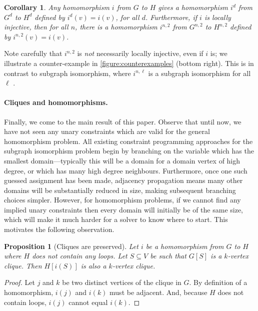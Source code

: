 \documentclass{article}
\newtheorem{proposition}{Proposition}
\newtheorem{corollary}{Corollary}
\begin{document}
\begin{corollary}Any homomorphism $i$ from $G$ to $H$ gives a homomorphism $i^d$ from $G^d$ to $H^d$
    defined by $i^d(v) = i(v)$, for all $d$. Furthermore, if $i$ is locally injective, then for all
    $n$, there is a homomorphism $i^{n,2}$ from $G^{n,2}$ to
    $H^{n,2}$ defined by $i^{n,2}(v) = i(v)$.\label{corollary:lishapes}
\end{corollary}

Note carefully that $i^{n,2}$ is \emph{not} necessarily locally injective, even if $i$ is; we
illustrate a counter-example in \cref{figure:counterexamples} (bottom right). This is in contrast to
subgraph isomorphism, where $i^{n,\ell}$ is a subgraph isomorphism for all $\ell$
\cite{DBLP:conf/cp/McCreeshP15}.

\paragraph{Cliques and homomorphisms.} Finally, we come to the main result of this paper. Observe
that until now, we have not seen any unary constraints which are valid for the general homomorphism
problem. All existing constraint programming approaches for the subgraph isomorphism problem begin
by branching on the variable which has the smallest domain---typically this will be a domain for a
domain vertex of high degree, or which has many high degree neighbours. Furthermore, once one such
guessed assignment has been made, adjacency propagation means many other domains will be
substantially reduced in size, making subsequent branching choices simpler.  However, for
homomorphism problems, if we cannot find any implied unary constraints then every domain will
initially be of the same size, which will make it much harder for a solver to know where to start.
This motivates the following observation.

\begin{proposition}[Cliques are preserved]\label{proposition:clique}
    Let $i$ be a homomorphism from $G$ to $H$ where $H$ does
    not contain any loops. Let $S\subseteq V$ be such that $G[S]$ is a $k$-vertex clique. Then
    $H[i(S)]$ is also a $k$-vertex clique.
\end{proposition}

\begin{proof}
    Let $j$ and $k$ be two distinct vertices of the clique in $G$. By definition of a homomorphism,
    $i(j)$ and $i(k)$ must be adjacent. And, because $H$ does not contain loops, $i(j)$ cannot equal
    $i(k)$.
\end{proof}
\end{document}

